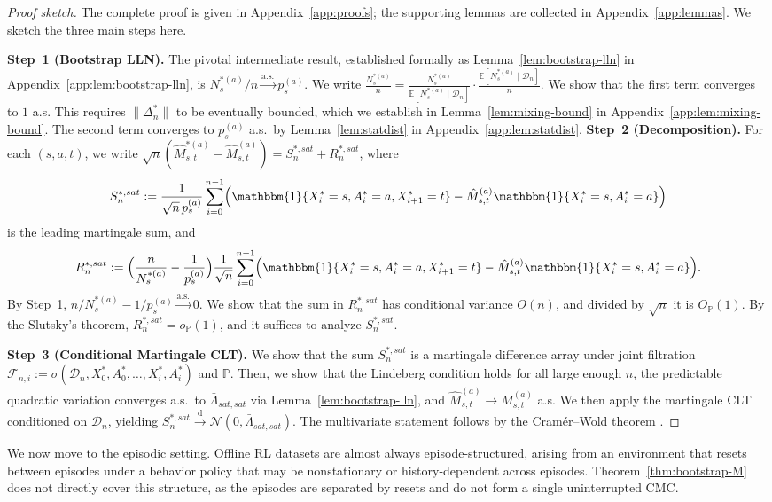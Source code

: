\documentclass{article}
\numberwithin{equation}{section}
\newcommand{\indicator}{\mathbbm{1}}
\begin{document}
\begin{proof}[Proof sketch]
The complete proof is given in Appendix~\ref{app:proofs}; the supporting lemmas are collected in Appendix~\ref{app:lemmas}. We sketch the three main steps here.

\textbf{Step~1 (Bootstrap LLN).}
The pivotal intermediate result, established formally as Lemma~\ref{lem:bootstrap-lln} in Appendix~\ref{app:lem:bootstrap-lln}, is $N_s^{\ast(a)}/n\xrightarrow{\mathrm{a.s.}} p_s^{(a)}$. We write $\tfrac{N_s^{\ast(a)}}{n} = \tfrac{N_s^{\ast(a)}}{\mathbb{E}[N_s^{\ast(a)}\mid\mathcal{D}_n]} \cdot \tfrac{\mathbb{E}[N_s^{\ast(a)}\mid\mathcal{D}_n]}{n}$.
We show that the first term converges to $1$ a.s.
This requires $\|\Delta_n^\ast\|$ to be eventually bounded, which we establish in Lemma~\ref{lem:mixing-bound} in Appendix~\ref{app:lem:mixing-bound}.
The second term converges to $p_s^{(a)}$ a.s.\ by Lemma~\ref{lem:statdist} in Appendix~\ref{app:lem:statdist}.
\textbf{Step~2 (Decomposition).}
For each $(s,a,t)$, we write $\sqrt{n}(\hat M_{s,t}^{\ast(a)} - \hat M_{s,t}^{(a)}) = S_n^{\ast,sat} + R_n^{\ast,sat}$, where
\[
S_n^{\ast,sat} := \frac{1}{\sqrt{n}\,p_s^{(a)}}\sum_{i=0}^{n-1}\Bigl(\indicator\{X_i^\ast=s,A_i^\ast=a,X_{i+1}^\ast=t\} - \hat M_{s,t}^{(a)}\indicator\{X_i^\ast=s,A_i^\ast=a\}\Bigr)
\]
is the leading martingale sum, and
\[
R_n^{\ast,sat} := \Bigl(\frac{n}{N_s^{\ast(a)}} - \frac{1}{p_s^{(a)}}\Bigr)\frac{1}{\sqrt{n}}\sum_{i=0}^{n-1}\Bigl(\indicator\{X_i^\ast=s,A_i^\ast=a,X_{i+1}^\ast=t\} - \hat M_{s,t}^{(a)}\indicator\{X_i^\ast=s,A_i^\ast=a\}\Bigr).
\]
By Step~1, $n/N_s^{\ast(a)}-1/p_s^{(a)}\xrightarrow{\mathrm{a.s.}}0$.
We show that the sum in $R_n^{\ast,sat}$ has conditional variance $O(n)$, and divided by $\sqrt{n}$ it is $O_\mathbb{P}(1)$.
By the Slutsky's theorem, $R_n^{\ast,sat}=o_\mathbb{P}(1)$, and it suffices to analyze $S_n^{\ast,sat}$.

\textbf{Step~3 (Conditional Martingale CLT).}
We show that the sum $S_n^{\ast,sat}$ is a martingale difference array under joint filtration $\mathcal{F}_{n,i}:=\sigma(\mathcal{D}_n,X_0^\ast,A_0^\ast,\ldots,X_i^\ast,A_i^\ast)$ and $\mathbb{P}$. 
Then, we show that the Lindeberg condition holds for all large enough $n$, the predictable quadratic variation converges a.s.\ to $\bar\Lambda_{sat,sat}$ via Lemma~\ref{lem:bootstrap-lln}, and $\hat M^{(a)}_{s,t}\to M^{(a)}_{s,t}$ a.s. 
We then apply the martingale CLT \citep[Corollary 3.1]{hall1980martingale} conditioned on $\mathcal{D}_n$, yielding $S_n^{\ast,sat}\xrightarrow{\mathrm{d}}\mathcal{N}(0,\bar\Lambda_{sat,sat})$. The multivariate statement follows by the Cramér--Wold theorem  \citep{cramer1936some}.
\end{proof}
We now move to the episodic setting.
Offline RL datasets are almost always episode-structured, arising from an environment that resets between episodes under a behavior policy that may be nonstationary or history-dependent across episodes.
Theorem~\ref{thm:bootstrap-M} does not directly cover this structure, as the episodes are separated by resets and do not form a single uninterrupted CMC.
\end{document}
